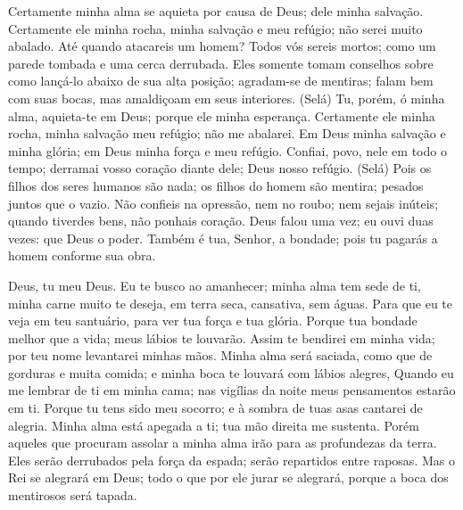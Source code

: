 {\PP 
  Certamente minha alma se aquieta por causa de Deus; dele
{} minha salvação.
  Certamente ele
{} minha rocha, minha salvação e meu refúgio; não serei muito abalado.
  Até quando atacareis um homem? Todos vós sereis mortos;
{} como um parede tombada e uma cerca derrubada.
  Eles somente tomam conselhos sobre como lançá-lo abaixo de sua alta posição; agradam-se de mentiras; falam bem com suas bocas, mas amaldiçoam em seus interiores. (Selá)
  Tu, porém, ó minha alma, aquieta-te em Deus; porque ele
{} minha esperança.
  Certamente ele
{} minha rocha, minha salvação
{} meu refúgio; não me abalarei.
  Em Deus
{} minha salvação e minha glória; em Deus
{} minha força e meu refúgio.
  Confiai, povo, nele em todo o tempo; derramai vosso coração diante dele; Deus
{} nosso refúgio. (Selá)
  Pois os filhos dos seres humanos são nada; os filhos do homem são mentira; pesados juntos
{} que o vazio.
  Não confieis na opressão, nem no roubo; nem sejais inúteis; quando tiverdes bens, não ponhais
{} coração.
  Deus falou uma vez; eu ouvi duas vezes: que
{} Deus
{} o poder.
  Também é tua, Senhor, a bondade; pois tu pagarás a
{} homem conforme sua obra.
\par }


{\PP 
  Deus, tu
{} meu Deus. Eu te busco ao amanhecer; minha alma tem sede de ti, minha carne muito te deseja, em terra seca, cansativa, sem águas.
  Para que eu te veja em teu santuário, para ver tua força e tua glória.
  Porque tua bondade
{} melhor que a vida; meus lábios te louvarão.
  Assim te bendirei em minha vida; por teu nome levantarei minhas mãos.
  Minha alma será saciada, como que de gorduras e muita comida; e minha boca te louvará com lábios alegres,
  Quando eu me lembrar de ti em minha cama; nas vigílias da noite meus pensamentos estarão em ti.
  Porque tu tens sido meu socorro; e à sombra de tuas asas cantarei de alegria.
  Minha alma está apegada a ti; tua mão direita me sustenta.
  Porém aqueles que procuram assolar a minha alma irão para as profundezas da terra.
  Eles serão derrubados pela força da espada; serão repartidos entre raposas.
  Mas o Rei se alegrará em Deus; todo o que por ele jurar se alegrará, porque a boca dos mentirosos será tapada.
\par }


